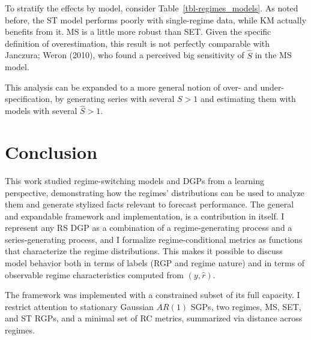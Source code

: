 \documentclass[
  letterpaper,
  DIV=11,
  numbers=noendperiod]{scrartcl}
\numberwithin{equation}{section}
\numberwithin{table}{section}
\numberwithin{figure}{section}
\let\oldsection\section
\renewcommand\section{\clearpage\oldsection}
\begin{document}
To stratify the effects by model, consider
Table~\ref{tbl-regimes_models}. As noted before, the ST model performs
poorly with single-regime data, while KM actually benefits from it. MS
is a little more robust than SET. Given the specific definition of
overestimation, this result is not perfectly comparable with Janczura;
Weron (2010), who found a perceived big sensitivity of \(\hat{S}\) in
the MS model.

\begin{table}[!htbp]

\caption{\label{tbl-regimes_models}Mis-specification of the number of
regimes}

\centering{



}

\end{table}%

This analysis can be expanded to a more general notion of over- and
under-specification, by generating series with several \(S > 1\) and
estimating them with models with several \(\hat{S} > 1\).

\section{Conclusion}\label{sec-conc}

This work studied regime-switching models and DGPs from a learning
perspective, demonstrating how the regimes' distributions can be used to
analyze them and generate stylized facts relevant to forecast
performance. The general and expandable framework and implementation, is
a contribution in itself. I represent any RS DGP as a combination of a
regime-generating process and a series-generating process, and I
formalize regime-conditional metrics as functions that characterize the
regime distributions. This makes it possible to discuss model behavior
both in terms of labels (RGP and regime nature) and in terms of
observable regime characteristics computed from \((y, \hat{r})\).

The framework was implemented with a constrained subset of its full
capacity. I restrict attention to stationary Gaussian \(AR(1)\) SGPs,
two regimes, MS, SET, and ST RGPs, and a minimal set of RC metrics,
summarized via distance across regimes.
\end{document}
